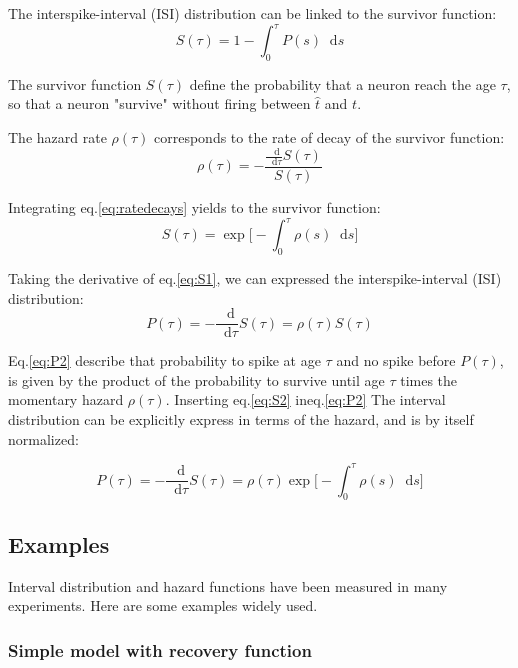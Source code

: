 \documentclass{report}
\newcommand{\dd}{
	\mathop{}\mathopen{}\mathrm{d}
}
\begin{document}
The interspike-interval (ISI) distribution can be linked to the survivor function:
\begin{equation}
  \label{eq:S1}
	S(\tau)=1-\int_0^\tau P(s) \dd s
\end{equation}


The survivor function $S(\tau)$ define the probability that a neuron reach the age $\tau$, so that a neuron "survive" without firing between $\hat{t}$ and $t$.

The hazard rate $\rho(\tau)$ corresponds to the rate of decay of the survivor function:
\begin{equation}
\label{eq:ratedecays}
\rho(\tau)=-\frac{\frac{\dd}{\dd \tau}S(\tau)}{S(\tau)}
\end{equation}

Integrating eq.\ref{eq:ratedecays} yields to the survivor function:
\begin{equation}
  \label{eq:S2}
S(\tau)=\exp\big[-\int_0^\tau\rho(s)\dd s\big]
\end{equation}

Taking the derivative of eq.\eqref{eq:S1}, we can expressed the interspike-interval (ISI) distribution:
\begin{equation}
\label{eq:P2}
P(\tau)=-\frac{\dd}{\dd \tau}S(\tau)=\rho(\tau)S(\tau)
\end{equation}

Eq.\eqref{eq:P2} describe that probability to spike at age $\tau$ and no spike before $P(\tau)$, is given by the product of the probability to survive until age $\tau$ times the momentary hazard $\rho(\tau)$. Inserting eq.\eqref{eq:S2} ineq.\ref{eq:P2} The interval distribution can be explicitly express in terms of the hazard, and is by itself normalized:

\begin{equation}
\label{eq:P2}
P(\tau)=-\frac{\dd}{\dd \tau}S(\tau)=\rho(\tau)\exp\big[-\int_0^\tau\rho(s)\dd s\big]
\end{equation}





\subsection{Examples }
\label{sec:ex}

Interval distribution and hazard functions have been measured in many experiments. Here are some examples widely used.



\subsubsection{Simple model with recovery function}
\end{document}
